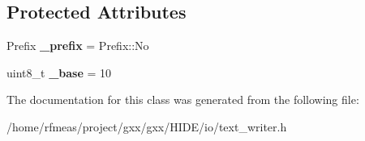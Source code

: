 \subsection*{Protected Attributes}
\begin{DoxyCompactItemize}
\item 
Prefix {\bfseries \+\_\+prefix} = Prefix\+::\+No\hypertarget{classgxx_1_1IntegerSpec_a1f48a8b965398126af2246f48ea83d04}{}\label{classgxx_1_1IntegerSpec_a1f48a8b965398126af2246f48ea83d04}

\item 
uint8\+\_\+t {\bfseries \+\_\+base} = 10\hypertarget{classgxx_1_1IntegerSpec_aa14de90bfdd617480daa5b183f8245f0}{}\label{classgxx_1_1IntegerSpec_aa14de90bfdd617480daa5b183f8245f0}

\end{DoxyCompactItemize}


The documentation for this class was generated from the following file\+:\begin{DoxyCompactItemize}
\item 
/home/rfmeas/project/gxx/gxx/\+H\+I\+D\+E/io/text\+\_\+writer.\+h\end{DoxyCompactItemize}
